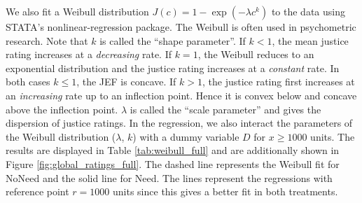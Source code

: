 \documentclass[12pt]{scrartcl}
\begin{document}
We also fit a Weibull distribution $J(c)=1-\exp(-\lambda c^k)$ to the data using STATA's nonlinear-regression package.
The Weibull is often used in psychometric research.
Note that $k$ is called the ``shape parameter''.
If $k<1$, the mean justice rating increases at a \textit{decreasing} rate.
If $k=1$, the Weibull reduces to an exponential distribution and the justice rating increases at a \textit{constant} rate.
In both cases $k\le 1$, the JEF is concave.
If $k>1$, the justice rating first increases at an \textit{increasing} rate up to an inflection point.
Hence it is convex below and concave above the inflection point.
$\lambda$ is called the ``scale parameter'' and gives the dispersion of justice ratings.
In the regression, we also interact the parameters of the Weibull distribution ($\lambda$, $k$) with a dummy variable $D$ for $x\ge 1000$ units.
The results are displayed in Table \ref{tab:weibull_full} and are additionally shown in Figure \ref{fig:global_ratings_full}.
The dashed line represents the Weibull fit for NoNeed and the solid line for Need.
The lines represent the regressions with reference point $r=1000$ units since this gives a better fit in both treatments.
\end{document}
